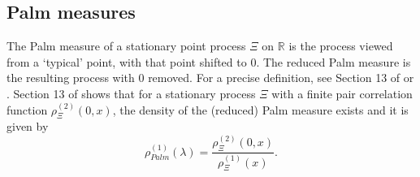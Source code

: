 \documentclass[12pt]{article}
\theoremstyle{definition} %
\newcommand{\R}{{\mathbb R}}
\theoremstyle{remark} %
\newcommand{\cG}{{\mathcal G}}
\begin{document}






\subsection{Palm measures}

The Palm measure of a stationary point process $\Xi$ on $\R$ is the process viewed from a `typical' point, with that point shifted to 0. The reduced Palm measure is the resulting process with 0 removed. 
For a precise definition, see Section 13 of \cite{DVJ2}  or \cite{BVBV_Palm}. 
Section 13 of \cite{DVJ2}  shows that for a stationary process $\Xi$ with a finite pair correlation function $\rho_{\Xi}^{(2)}(0,x)$, the density  of the (reduced) Palm measure exists and it is given by 
\[\rho_{Palm}^{(1)}(\lambda)=\frac{\rho_{\Xi}^{(2)}(0,x)}{\rho_{\Xi}^{(1)}(x)}.
\]
\end{document}
